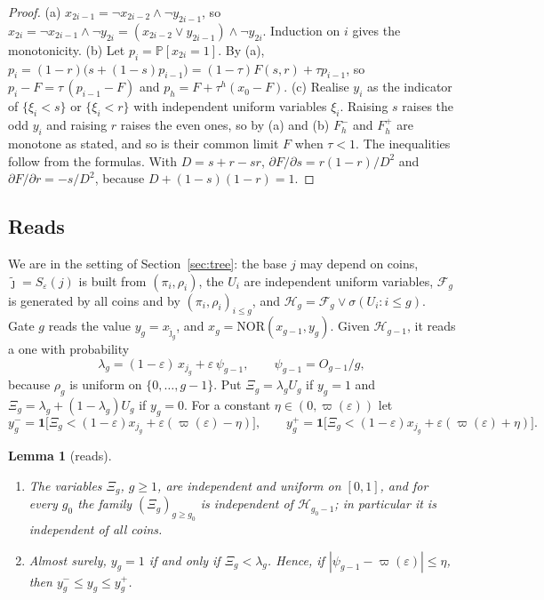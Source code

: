 \documentclass[11pt]{amsart}
\newtheorem{lemma}[theorem]{Lemma}
\theoremstyle{definition}
\theoremstyle{remark}
\newcommand{\eps}{\varepsilon}
\newcommand{\jt}{\tilde{\jmath}}
\newcommand{\NOR}{\mathrm{NOR}}
\newcommand{\PP}{\mathbb{P}}
\newcommand{\cF}{\mathcal{F}}
\begin{document}
\begin{proof}
(a) $x_{2i-1}=\neg x_{2i-2}\wedge\neg y_{2i-1}$, so
$x_{2i}=\neg x_{2i-1}\wedge\neg y_{2i}=(x_{2i-2}\vee y_{2i-1})\wedge\neg y_{2i}$. Induction on $i$
gives the monotonicity.
(b) Let $p_i=\PP[x_{2i}=1]$. By (a), $p_i=(1-r)\bigl(s+(1-s)p_{i-1}\bigr)=(1-\tau)F(s,r)+\tau p_{i-1}$,
so $p_i-F=\tau\,(p_{i-1}-F)$ and $p_h=F+\tau^h(x_0-F)$.
(c) Realise $y_i$ as the indicator of $\{\xi_i<s\}$ or $\{\xi_i<r\}$ with independent uniform
variables $\xi_i$. Raising $s$ raises the odd $y_i$ and raising $r$ raises the even ones, so by
(a) and (b) $F^-_h$ and $F^+_h$ are monotone as stated, and so is their common limit $F$ when
$\tau<1$. The inequalities follow from the formulas. With $D=s+r-sr$,
$\partial F/\partial s=r(1-r)/D^2$ and $\partial F/\partial r=-s/D^2$, because $D+(1-s)(1-r)=1$.
\end{proof}

\subsection{Reads}

We are in the setting of Section~\ref{sec:tree}: the base $j$ may depend on coins,
$\jt=S_\eps(j)$ is built from $(\pi_i,\rho_i)$, the $U_i$ are independent uniform variables,
$\cF_g$ is generated by all coins and by $(\pi_i,\rho_i)_{i\le g}$, and
$\mathcal H_g=\cF_g\vee\sigma(U_i:i\le g)$. Gate $g$ reads the value $y_g=x_{\jt_g}$, and
$x_g=\NOR(x_{g-1},y_g)$. Given $\mathcal H_{g-1}$, it reads a one with probability
\[
\lambda_g=(1-\eps)\,x_{j_g}+\eps\,\psi_{g-1},\qquad\psi_{g-1}=O_{g-1}/g ,
\]
because $\rho_g$ is uniform on $\{0,\dots,g-1\}$. Put $\Xi_g=\lambda_gU_g$ if $y_g=1$ and
$\Xi_g=\lambda_g+(1-\lambda_g)U_g$ if $y_g=0$. For a constant $\eta\in(0,\varpi(\eps))$ let
\[
y^-_g=\mathbf 1\bigl[\Xi_g<(1-\eps)x_{j_g}+\eps(\varpi(\eps)-\eta)\bigr],\qquad
y^+_g=\mathbf 1\bigl[\Xi_g<(1-\eps)x_{j_g}+\eps(\varpi(\eps)+\eta)\bigr].
\]

\begin{lemma}[reads]\label{lem:reads}
\begin{enumerate}[label=(\alph*),leftmargin=2.4em]
\item The variables $\Xi_g$, $g\ge1$, are independent and uniform on $[0,1]$, and for every $g_0$
the family $(\Xi_g)_{g\ge g_0}$ is independent of $\mathcal H_{g_0-1}$; in particular it is
independent of all coins.
\item Almost surely, $y_g=1$ if and only if $\Xi_g<\lambda_g$. Hence, if
$|\psi_{g-1}-\varpi(\eps)|\le\eta$, then $y^-_g\le y_g\le y^+_g$.
\end{enumerate}
\end{lemma}
\end{document}
